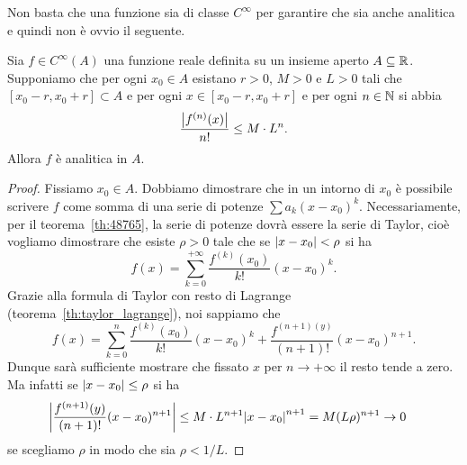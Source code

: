 Non basta che una funzione sia di classe $C^\infty$ per garantire
che sia anche analitica e quindi non è ovvio il seguente.

\begin{theorem}
\label{th:criterio_analitica}
Sia $f\in C^\infty(A)$ una funzione reale definita su un
insieme aperto $A\subseteq \mathbb R$. Supponiamo che per ogni $x_0\in A$ esistano $r>0$,
$M>0$ e $L>0$ tali che $[x_0-r, x_0+r] \subset A$ e
per ogni $x\in [x_0-r, x_0+r]$ e per
ogni $n\in \mathbb N$ si abbia
\[
  \frac{{\left|f^{(n)}(x)\right|}}{n!} \le M\cdot L^n.
\]
Allora $f$ è analitica in $A$.
\end{theorem}
%
\begin{proof}
Fissiamo $x_0\in A$.
Dobbiamo dimostrare che in un intorno di $x_0$ è possibile
scrivere $f$ come somma di una serie di potenze $\sum a_k (x-x_0)^k$.
Necessariamente, per il teorema~\ref{th:48765}, la serie
di potenze dovrà essere la serie di Taylor, cioè vogliamo dimostrare che
esiste $\rho>0$ tale che se ${\left|x-x_0\right|}< \rho$ si ha
\[
  f(x) = \sum_{k=0}^{+\infty} \frac{f^{(k)}(x_0)}{k!}(x-x_0)^k.
\]
Grazie alla formula di Taylor con resto di Lagrange (teorema~\ref{th:taylor_lagrange}),
noi sappiamo che
\[
  f(x) = \sum_{k=0}^{n} \frac{f^{(k)}(x_0)}{k!}(x-x_0)^k
   + \frac{f^{(n+1)(y)}}{(n+1)!}(x-x_0)^{n+1}.
\]
Dunque sarà sufficiente mostrare che fissato $x$ per $n\to +\infty$ il resto
tende a zero.
Ma infatti se ${\left|x-x_0\right|}\le \rho$ si ha
\begin{align*}
 {\left|\frac{f^{(n+1)}(y)}{(n+1)!}(x-x_0)^{n+1}\right|}
 & \le  M\cdot L^{n+1}{\left|x-x_0\right|}^{n+1}
 = M (L\rho)^{n+1}\to 0
\end{align*}
se scegliamo $\rho$ in modo che sia $\rho < 1/L$.
\end{proof}

